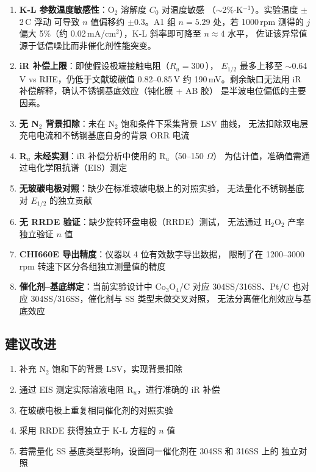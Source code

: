 \documentclass[12pt,a4paper]{ctexart}
\begin{document}
\begin{enumerate}[leftmargin=1.5cm]
  \item \textbf{K-L 参数温度敏感性}：O$_2$ 溶解度 $C_0$ 对温度敏感
  （$\sim$2\%$\cdot$K$^{-1}$）。实验温度 $\pm$2\,\textdegree C 浮动
  可导致 $n$ 值偏移约 $\pm$0.3。A1 组 $n=5.29$ 处，若 1000\,rpm 测得的
  $j$ 偏大 5\%（约 0.02\,mA/cm$^2$），K-L 斜率即可降至 $n\approx 4$ 水平，
  佐证该异常值源于低信噪比而非催化剂性能突变。
  \item \textbf{iR 补偿上限}：即使假设极端接触电阻（$R_u=300$\,\Omega），
  $E_{1/2}$ 最多上移至 $\sim$0.64\,V vs RHE，仍低于文献玻碳值 0.82--0.85\,V
  约 190\,mV。剩余缺口无法用 iR 补偿解释，确认不锈钢基底效应（钝化膜 + AB 胶）
  是半波电位偏低的主要因素。
  \item \textbf{无 N$_2$ 背景扣除}：未在 N$_2$ 饱和条件下采集背景 LSV 曲线，
  无法扣除双电层充电电流和不锈钢基底自身的背景 ORR 电流
  \item \textbf{R$_u$ 未经实测}：iR 补偿分析中使用的 R$_u$（50--150 $\Omega$）
  为估计值，准确值需通过电化学阻抗谱（EIS）测定
  \item \textbf{无玻碳电极对照}：缺少在标准玻碳电极上的对照实验，
  无法量化不锈钢基底对 $E_{1/2}$ 的独立贡献
  \item \textbf{无 RRDE 验证}：缺少旋转环盘电极（RRDE）测试，
  无法通过 H$_2$O$_2$ 产率独立验证 $n$ 值
  \item \textbf{CHI660E 导出精度}：仪器以 4 位有效数字导出数据，
  限制了在 1200--3000 rpm 转速下区分各组独立测量值的精度
  \item \textbf{催化剂--基底绑定}：当前实验设计中 Co$_3$O$_4$/C 对应
  304SS/316SS、Pt/C 也对应 304SS/316SS，催化剂与 SS 类型未做交叉对照，
  无法分离催化剂效应与基底效应
\end{enumerate}

\subsection{建议改进}

\begin{enumerate}[leftmargin=1.5cm]
  \item 补充 N$_2$ 饱和下的背景 LSV，实现背景扣除
  \item 通过 EIS 测定实际溶液电阻 R$_u$，进行准确的 iR 补偿
  \item 在玻碳电极上重复相同催化剂的对照实验
  \item 采用 RRDE 获得独立于 K-L 方程的 $n$ 值
  \item 若需量化 SS 基底类型影响，设置同一催化剂在 304SS 和 316SS 上的
  独立对照
\end{enumerate}
\end{document}
